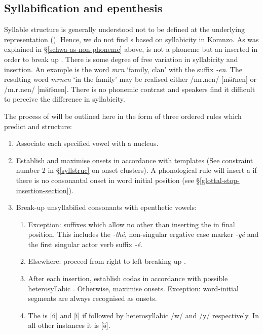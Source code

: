 \subsection{Syllabification and epenthesis} \label{syllabificationandepenthesis}

Syllable structure is generally understood not to be defined at the underlying representation (\citealt[221]{Blevins:1995tt}). Hence, we do not find s based on syllabicity in Komnzo. As was explained in \S{}\ref{schwa-as-non-phoneme} above,  is not a phoneme but an  inserted in order to break up . There is some degree of free variation in syllabicity and  insertion. An example is the word \emph{mrn} `family, clan' with the  suffix \emph{-en}. The resulting word \emph{mrnen} `in the family' may be realised either /mr.nen/ [mə̆ɾnen] or /m.r.nen/ [mə̆ɾə̆nen]. There is no phonemic contrast and speakers find it difficult to perceive the difference in syllabicity.%

The process of  will be outlined here in the form of three ordered rules which predict  and  structure:

\begin{enumerate}
	\item Associate each specified vowel with a  nucleus.
	\item Establish and maximise onsets in accordance with  templates (See constraint number 2 in \S{}\ref{syllstruc} on onset clusters). A phonological rule will insert a  if there is no consonantal onset in word initial position (see \S{}\ref{glottal-stop-insertion-section}).
	\item Break-up unsyllabified consonants with epenthetic vowels:
	\begin{enumerate}
		\item Exception: suffixes which allow no other  than inserting the  in final position. This includes the  \emph{-thé}, non-singular ergative case marker \emph{-yé} and the first singular actor verb suffix \emph{-é}.
		\item Elsewhere: proceed from right to left breaking up .
		\item After each  insertion, establish codas in accordance with possible heterosyllabic . Otherwise, maximise onsets. Exception: word-initial segments are always recognised as onsets.
		\item The  is [ŭ] and [ı̆] if followed by heterosyllabic /w/ and /y/ respectively. In all other instances it is [ə̆].
	\end{enumerate}
\end{enumerate}

